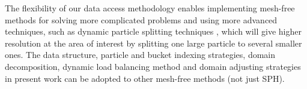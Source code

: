 The flexibility of our data access methodology enables implementing mesh-free methods for solving more complicated problems and using more advanced techniques, such as dynamic particle splitting techniques \citep{vacondio2012accurate, feldman2007dynamic}, which will give higher resolution at the area of interest by splitting one large particle to several smaller ones. The data structure, particle and bucket indexing strategies, domain decomposition, dynamic load balancing method and domain adjusting strategies in present work can be adopted to other mesh-free methods (not just SPH).
